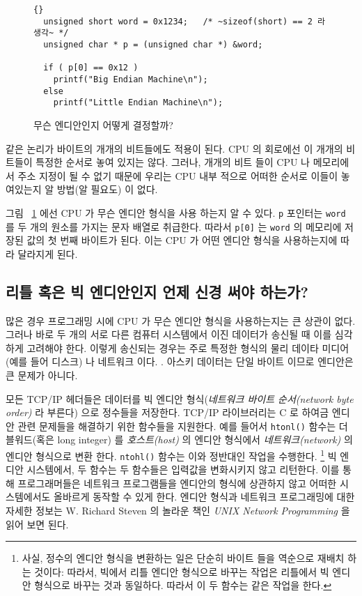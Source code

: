 \begin{figure}[t]
\begin{lstlisting}[stepnumber=0,frame=tblr, escapeinside=~~]{}
  unsigned short word = 0x1234;   /* ~sizeof(short) == 2 라 생각~ */
  unsigned char * p = (unsigned char *) &word;

  if ( p[0] == 0x12 )
    printf("Big Endian Machine\n");
  else
    printf("Little Endian Machine\n");
\end{lstlisting}
\caption{무슨 엔디안인지 어떻게 결정할까? \label{fig:determineEndian}}
\end{figure}

같은 논리가 바이트의 개개의 비트들에도 적용이 된다. CPU 의 회로에선
이 개개의 비트들이 특정한 순서로 놓여 있지는 않다. 그러나, 개개의 비트
들이 CPU 나 메모리에서 주소 지정이 될 수 없기 때문에 우리는 CPU 내부
적으로 어떠한 순서로 이들이 놓여있는지 알 방법(알 필요도) 이 없다. 

그림 ~\ref{fig:determineEndian} 에선 CPU 가 무슨 엔디안 형식을 사용
하는지 알 수 있다. \lstinline|p| 포인터는 \lstinline|word| 를 두 개의 
원소를 가지는 문자 배열로 취급한다. 따라서  \lstinline|p[0]| 는 
\lstinline|word|  의 메모리에 저장된 값의 첫 번째 바이트가 된다. 
이는 CPU 가 어떤 엔디안 형식을 사용하는지에 따라 달라지게 된다. 

\subsection{리틀 혹은 빅 엔디안인지 언제 신경 써야 하는가?}

많은 경우 프로그래밍 시에 CPU 가 무슨 엔디안 형식을 사용하는지는 큰 
상관이 없다. 그러나 바로 두 개의 서로 다른 컴퓨터 시스템에서 이진 데이터가 송신될 때
이를 심각하게 고려해야 한다. 이렇게 송신되는 경우는 주로 특정한 형식의 물리 데이타
미디어(예를 들어 디스크) 나 네트워크 이다. . 아스키 데이터는 단일
바이트 이므로 엔디안은 큰 문제가 아니다. 

모든 TCP/IP 헤더들은 데이터를 빅 엔디안 형식(\emph{네트워크 바이트 순서(network byte order)} 
라 부른다) 으로 정수들을 저장한다. TCP/IP 라이브러리는 C 
로 하여금 엔디안 관련 문제들을 해결하기 위한 함수들을 지원한다. 
예를 들어서 \lstinline|htonl()| 함수는 더블워드(혹은 long integer) 를 \emph{호스트(host)}
의 엔디안 형식에서 \emph{네트워크(network)} 의 엔디안 형식으로 변환
한다. \lstinline|ntohl()| 함수는 이와 정반대인 작업을 수행한다. \footnote{사실, 정수의 엔디안
형식을 변환하는 일은 단순히 바이트 들을 역순으로 재배치 하는 것이다: 따라서, 빅에서 리틀
엔디안 형식으로 바꾸는 작업은 리틀에서 빅 엔디안 형식으로 바꾸는 것과
동일하다. 따라서 이 두 함수는 같은 작업을 한다.} 빅 엔디안 시스템에서, 두 함수는 
두 함수들은 입력값을 변화시키지 않고 리턴한다. 이를 통해 프로그래머들은 
네트워크 프로그램들을 엔디안의 형식에 상관하지 않고 어떠한 시스템에서도
올바르게 동작할 수 있게 한다. 엔디안 형식과 네트워크 프로그래밍에 대한
자세한 정보는 W. Richard Steven 의 놀라운 책인 \emph{UNIX Network Programming}
을 읽어 보면 된다. 


